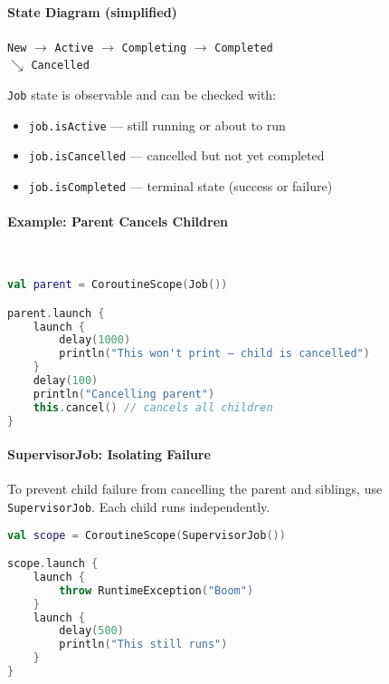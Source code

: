 \documentclass[a4paper,12pt]{article}
\begin{document}
\paragraph{State Diagram (simplified)}

\begin{center}
\texttt{New} $\rightarrow$ \texttt{Active} $\rightarrow$ \texttt{Completing} $\rightarrow$ \texttt{Completed} \\
\hspace{3.5cm} $\searrow$ \texttt{Cancelled}
\end{center}

\texttt{Job} state is observable and can be checked with:
\begin{itemize}
  \item \texttt{job.isActive} — still running or about to run
  \item \texttt{job.isCancelled} — cancelled but not yet completed
  \item \texttt{job.isCompleted} — terminal state (success or failure)
\end{itemize}

\paragraph{Example: Parent Cancels Children}\mbox{}\\
\begin{lstlisting}[language=Kotlin]
val parent = CoroutineScope(Job())

parent.launch {
    launch {
        delay(1000)
        println("This won't print — child is cancelled")
    }
    delay(100)
    println("Cancelling parent")
    this.cancel() // cancels all children
}
\end{lstlisting}

\paragraph{SupervisorJob: Isolating Failure}
To prevent child failure from cancelling the parent and siblings, use \texttt{SupervisorJob}. Each child runs independently.

\begin{lstlisting}[language=Kotlin]
val scope = CoroutineScope(SupervisorJob())

scope.launch {
    launch {
        throw RuntimeException("Boom")
    }
    launch {
        delay(500)
        println("This still runs")
    }
}
\end{lstlisting}
\end{document}

